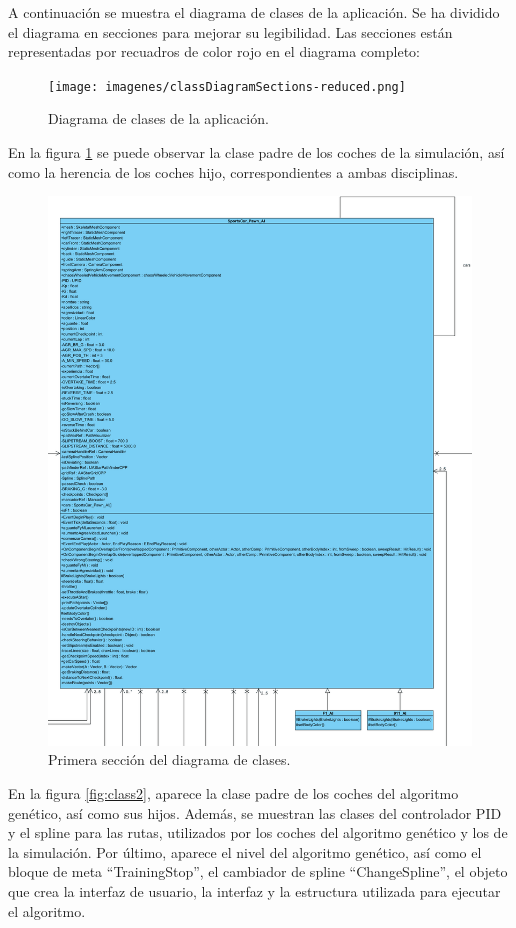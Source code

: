 A continuación se muestra el diagrama de clases de la aplicación. Se ha dividido el diagrama en secciones para mejorar su legibilidad. Las secciones están representadas por recuadros de color rojo en el diagrama completo:

\begin{figure}[H]
    \centering
    \texttt{[image: imagenes/classDiagramSections-reduced.png]}
    \caption{Diagrama de clases de la aplicación.}
\end{figure}


En la figura \ref{fig:class1} se puede observar la clase padre de los coches de la simulación, así como la herencia de los coches hijo, correspondientes a ambas disciplinas.
\begin{figure}[H]
    \centering
    \includegraphics[width=\textwidth]{imagenes/classDiagram1.png}
    \caption{Primera sección del diagrama de clases.}
    \label{fig:class1}
\end{figure}


En la figura \ref{fig:class2}, aparece la clase padre de los coches del algoritmo genético, así como sus hijos. Además, se muestran las clases del controlador PID y el spline para las rutas, utilizados por los coches del algoritmo genético y los de la simulación. Por último, aparece el nivel del algoritmo genético, así como el bloque de meta ``TrainingStop'', el cambiador de spline ``ChangeSpline'', el objeto que crea la interfaz de usuario, la interfaz y la estructura utilizada para ejecutar el algoritmo.


